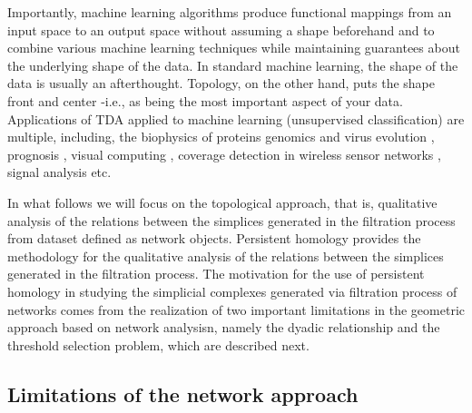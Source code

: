\documentclass[onecollarge,runningheads]{svjour2}
\begin{document}
Importantly, machine learning algorithms produce functional mappings from an input space to an output space without assuming a shape beforehand and to combine various machine learning techniques while maintaining guarantees about the underlying shape of the data. In standard machine learning, the shape of the data is usually an afterthought. Topology, on the other hand, puts the shape front and center -i.e., as being the most important aspect of your data.
Applications of TDA applied to machine learning (unsupervised classification) are multiple, including, the biophysics of proteins \cite{gameiro2015topological} genomics and virus evolution \cite{chan2013topology}, prognosis \cite{schmidt2011disease}, visual computing \cite{bendich2010computing}, coverage detection in wireless sensor networks \cite{ghrist2005coverage}, signal analysis \cite{perea2015sliding} etc.



In what follows we will focus on the topological approach, that is, qualitative analysis of the relations between the simplices generated in the filtration process from dataset defined as network objects. %
Persistent homology provides the methodology for the qualitative analysis of the relations between the simplices generated in the filtration process. The motivation for the use of persistent homology in studying the simplicial complexes generated via filtration process of networks comes from the realization of two important limitations in the geometric approach based on network analysisn, namely the dyadic relationship and the threshold selection problem, which are described next.

\subsection{Limitations of the network approach}
\label{se:limita}
\end{document}

